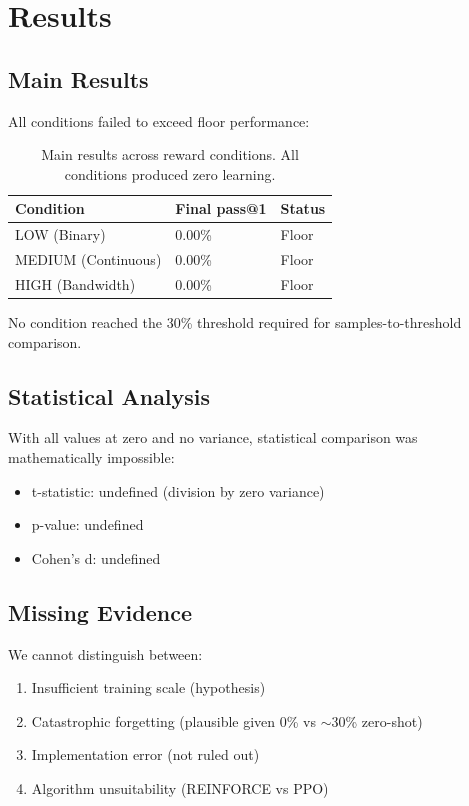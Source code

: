 \section{Results}

\subsection{Main Results}

All conditions failed to exceed floor performance:

\begin{table}[h]
\centering
\begin{tabular}{@{}lll@{}}
\toprule
Condition & Final pass@1 & Status \\
\midrule
LOW (Binary) & 0.00\% & Floor \\
MEDIUM (Continuous) & 0.00\% & Floor \\
HIGH (Bandwidth) & 0.00\% & Floor \\
\bottomrule
\end{tabular}
\caption{Main results across reward conditions. All conditions produced zero learning.}
\label{tab:main-results}
\end{table}

No condition reached the 30\% threshold required for samples-to-threshold comparison.

\subsection{Statistical Analysis}

With all values at zero and no variance, statistical comparison was mathematically impossible:
\begin{itemize}
    \item t-statistic: undefined (division by zero variance)
    \item p-value: undefined
    \item Cohen's d: undefined
\end{itemize}

\subsection{Missing Evidence}

We cannot distinguish between:
\begin{enumerate}
    \item Insufficient training scale (hypothesis)
    \item Catastrophic forgetting (plausible given 0\% vs $\sim$30\% zero-shot)
    \item Implementation error (not ruled out)
    \item Algorithm unsuitability (REINFORCE vs PPO)
\end{enumerate}
